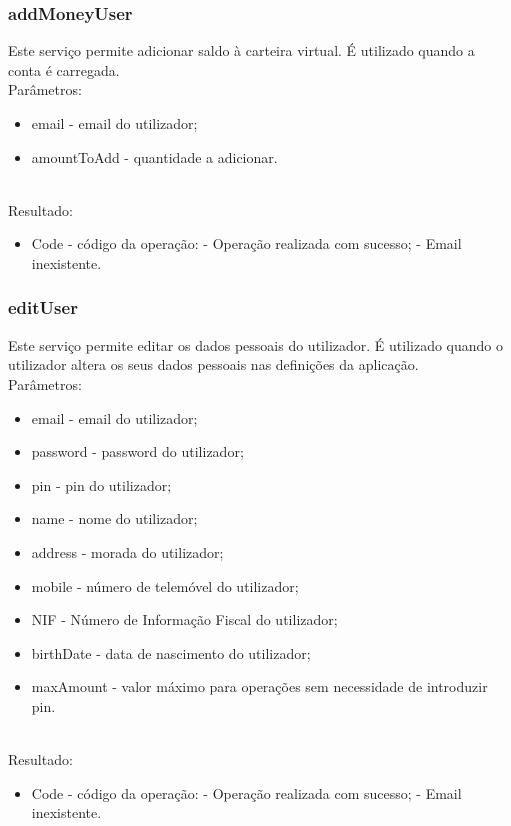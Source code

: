 \subsubsection{addMoneyUser}

Este serviço permite adicionar saldo à carteira virtual. É utilizado quando a conta é carregada.
\newline
~\\Parâmetros:
\begin{itemize}
\item email - email do utilizador;
\item amountToAdd - quantidade a adicionar.
\end{itemize}

~\\Resultado:
\begin{itemize}
\item Code - código da operação:
 - Operação realizada com sucesso;
 - Email inexistente.
\end{itemize}

\subsubsection{editUser}

Este serviço permite editar os dados pessoais do utilizador. É utilizado quando o utilizador altera os seus dados pessoais nas definições da aplicação.
\newline
~\\Parâmetros:
\begin{itemize}
\item email - email do utilizador;
\item password - password do utilizador;
\item pin - pin do utilizador;
\item name - nome do utilizador;
\item address - morada do utilizador;
\item mobile - número de telemóvel do utilizador;
\item NIF - Número de Informação Fiscal do utilizador;
\item birthDate - data de nascimento do utilizador;
\item maxAmount - valor máximo para operações sem necessidade de introduzir pin.
\end{itemize}

~\\Resultado:
\begin{itemize}
\item Code - código da operação:
 - Operação realizada com sucesso;
 - Email inexistente.
\end{itemize}

